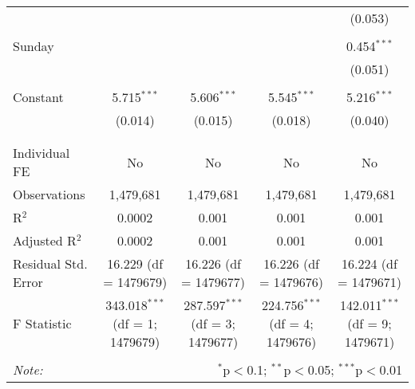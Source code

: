 \documentclass[
]{article}
\begin{document}
\begin{table}[!htbp]
{\begin{tabular}{@{\extracolsep{5pt}}lcccc}
  &  &  &  & (0.053) \\ 
  & & & & \\ 
 Sunday &  &  &  & 0.454$^{***}$ \\ 
  &  &  &  & (0.051) \\ 
  & & & & \\ 
 Constant & 5.715$^{***}$ & 5.606$^{***}$ & 5.545$^{***}$ & 5.216$^{***}$ \\ 
  & (0.014) & (0.015) & (0.018) & (0.040) \\ 
  & & & & \\ 
\hline \\[-1.8ex] 
Individual FE & No & No & No & No \\ 
Observations & 1,479,681 & 1,479,681 & 1,479,681 & 1,479,681 \\ 
R$^{2}$ & 0.0002 & 0.001 & 0.001 & 0.001 \\ 
Adjusted R$^{2}$ & 0.0002 & 0.001 & 0.001 & 0.001 \\ 
Residual Std. Error & 16.229 (df = 1479679) & 16.226 (df = 1479677) & 16.226 (df = 1479676) & 16.224 (df = 1479671) \\ 
F Statistic & 343.018$^{***}$ (df = 1; 1479679) & 287.597$^{***}$ (df = 3; 1479677) & 224.756$^{***}$ (df = 4; 1479676) & 142.011$^{***}$ (df = 9; 1479671) \\ 
\hline 
\hline \\[-1.8ex] 
\textit{Note:}  & \multicolumn{4}{r}{$^{*}$p$<$0.1; $^{**}$p$<$0.05; $^{***}$p$<$0.01} \\ 
\end{tabular}
} 
\end{table} 
\newpage
\end{document}
